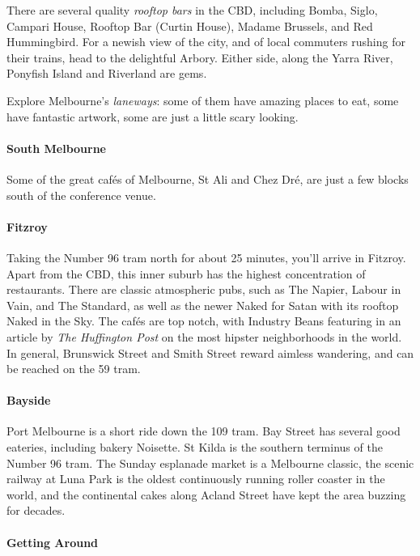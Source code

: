 There are several quality \emph{rooftop bars} in the CBD,
including Bomba, Siglo, Campari
House, Rooftop Bar (Curtin House), Madame Brussels, and Red Hummingbird.
For a newish view of the city, and of local commuters rushing for
their trains, head to the delightful Arbory. Either side, along the 
Yarra River, Ponyfish Island and Riverland are gems.

Explore Melbourne's {\em laneways}: some of them have amazing places to 
eat,
some have fantastic artwork, some are just a little scary looking.

\paragraph{South Melbourne}

Some of the great caf{\'e}s of Melbourne, St Ali and Chez Dr{\'e},
are just a few blocks south of the conference venue.

\paragraph{Fitzroy}

Taking the Number 96 tram north for about 25 minutes, you'll arrive in
Fitzroy.
Apart from the CBD, this inner suburb has the highest concentration of
restaurants.
There are classic atmospheric pubs, such as The Napier, Labour in
Vain, and The Standard, as well as the newer Naked for Satan with its 
rooftop
Naked in the Sky.
The caf{\'e}s are top notch, with Industry Beans
featuring in an article by {\em The Huffington Post} on the most hipster
neighborhoods in the world.
In general, Brunswick Street and Smith Street reward aimless wandering,
and can be reached on the 59 tram.

 

\paragraph{Bayside}

Port Melbourne is a short ride down the 109 tram. Bay Street has several good
eateries, including bakery Noisette.
St Kilda is the southern terminus of the Number 96 tram. The Sunday 
esplanade
market is a Melbourne classic, the scenic railway at Luna Park is the 
oldest
continuously running roller coaster in the world, and the continental 
cakes
along Acland Street have kept the area buzzing for decades.


\paragraph{Getting Around}

